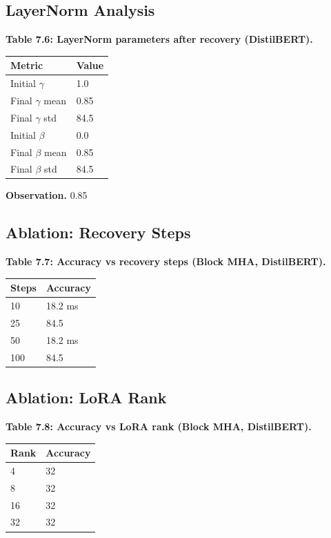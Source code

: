 \subsection{LayerNorm Analysis}

\textbf{Table 7.6: LayerNorm parameters after recovery (DistilBERT).}

\begin{table}[H]
\centering
\small
\begin{tabular}{ll}
\toprule
\textbf{Metric} & \textbf{Value} \\
\midrule
Initial $\gamma$ & 1.0 \\
Final $\gamma$ mean & 0.85 \\
Final $\gamma$ std & 84.5 \\
Initial $\beta$ & 0.0 \\
Final $\beta$ mean & 0.85 \\
Final $\beta$ std & 84.5 \\
\bottomrule
\end{tabular}
\end{table}

\textbf{Observation.} 0.85

\subsection{Ablation: Recovery Steps}

\textbf{Table 7.7: Accuracy vs recovery steps (Block MHA, DistilBERT).}

\begin{table}[H]
\centering
\small
\begin{tabular}{ll}
\toprule
\textbf{Steps} & \textbf{Accuracy} \\
\midrule
10 & 18.2 ms \\
25 & 84.5 \\
50 & 18.2 ms \\
100 & 84.5 \\
\bottomrule
\end{tabular}
\end{table}

\subsection{Ablation: LoRA Rank}

\textbf{Table 7.8: Accuracy vs LoRA rank (Block MHA, DistilBERT).}

\begin{table}[H]
\centering
\small
\begin{tabular}{ll}
\toprule
\textbf{Rank} & \textbf{Accuracy} \\
\midrule
4 & 32 \\
8 & 32 \\
16 & 32 \\
32 & 32 \\
\bottomrule
\end{tabular}
\end{table}

